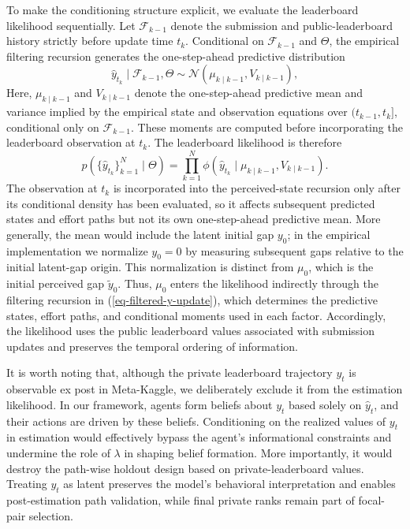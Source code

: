 \documentclass[mnsc]{informs3}
\begin{document}
To make the conditioning structure explicit, we evaluate the leaderboard likelihood sequentially. Let $\mathcal F_{k-1}$ denote the submission and public-leaderboard history strictly before update time $t_k$. Conditional on $\mathcal F_{k-1}$ and $\Theta$, the empirical filtering recursion generates the one-step-ahead predictive distribution
\[
\hat y_{t_k}\mid\mathcal F_{k-1},\Theta
\sim
\mathcal N\!\left(\mu_{k\mid k-1},V_{k\mid k-1}\right),
\]
Here, $\mu_{k\mid k-1}$ and $V_{k\mid k-1}$ denote the one-step-ahead predictive mean and variance implied by the empirical state and observation equations over $(t_{k-1},t_k]$, conditional only on $\mathcal F_{k-1}$. These moments are computed before incorporating the leaderboard observation at $t_k$.
The leaderboard likelihood is therefore
\begin{equation}\label{eq-obs_gap-prob}
p\left(\{\hat{y}_{t_k}\}_{k=1}^N\mid\Theta\right)
=
\prod_{k=1}^N
\phi\left(\hat y_{t_k}\mid\mu_{k\mid k-1},V_{k\mid k-1}\right).
\end{equation}
The observation at $t_k$ is incorporated into the perceived-state recursion only after its conditional density has been evaluated, so it affects subsequent predicted states and effort paths but not its own one-step-ahead predictive mean.
More generally, the mean would include the latent initial gap $y_0$; in the empirical implementation we normalize $y_0=0$ by measuring subsequent gaps relative to the initial latent-gap origin.
This normalization is distinct from $\mu_0$, which is the initial perceived gap $\tilde y_0$.
Thus, $\mu_0$ enters the likelihood indirectly through the filtering recursion in (\ref{eq-filtered-y-update}), which determines the predictive states, effort paths, and conditional moments used in each factor.
Accordingly, the likelihood uses the public leaderboard values associated with submission updates and preserves the temporal ordering of information.

It is worth noting that, although the private leaderboard trajectory $y_t$ is observable ex post in Meta-Kaggle, we deliberately exclude it from the estimation likelihood.
In our framework, agents form beliefs about $y_t$ based solely on $\hat{y}_t$, and their actions are driven by these beliefs.
Conditioning on the realized values of $y_t$ in estimation would effectively bypass the agent’s informational constraints and undermine the role of $\lambda$ in shaping belief formation.
More importantly, it would destroy the path-wise holdout design based on private-leaderboard values.
Treating $y_t$ as latent preserves the model’s behavioral interpretation and enables post-estimation path validation, while final private ranks remain part of focal-pair selection.
\end{document}
